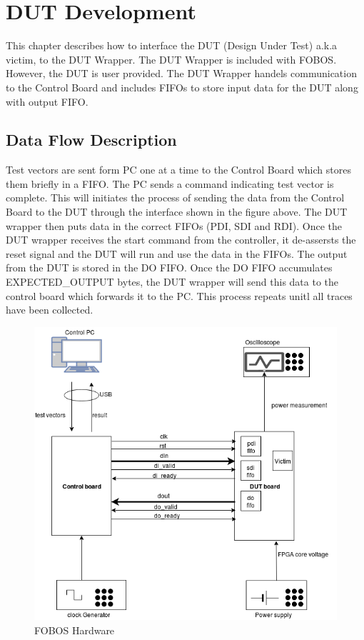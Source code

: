  \chapter{DUT Development} \label{chap:dut-dev}
 
This chapter describes how to interface the DUT (Design Under Test) a.k.a victim, to the DUT Wrapper.
The DUT Wrapper is included with FOBOS. However, the  DUT is user provided.
The DUT Wrapper handels communication to the Control Board and includes FIFOs to store input data for the DUT along with output FIFO.

\section{Data Flow Description}

Test vectors are sent form PC one at a time to the Control Board which stores them briefly in a FIFO.
The PC sends a command indicating test vector is complete. This will initiates the process of sending the data from the Control Board to the DUT through the interface shown in the figure above.
The DUT wrapper then puts data in the correct FIFOs (PDI, SDI and RDI).
Once the DUT wrapper receives the start command from the controller, it de-assersts the reset signal and the DUT will run and use the data in the FIFOs. The output from the DUT is stored in the DO FIFO.
Once the DO FIFO accumulates EXPECTED\_OUTPUT bytes, the DUT wrapper will send this data to the control board which forwards it to the PC.
This process repeats unitl all traces have been collected.

\begin{center}

\begin{figure}
  \label{fig:fobos-capture}
  \caption{FOBOS Hardware}
  \centering
   \includegraphics[scale=0.6]{../figures/FOBOS_Capture}
\end{figure}
\end{center}

